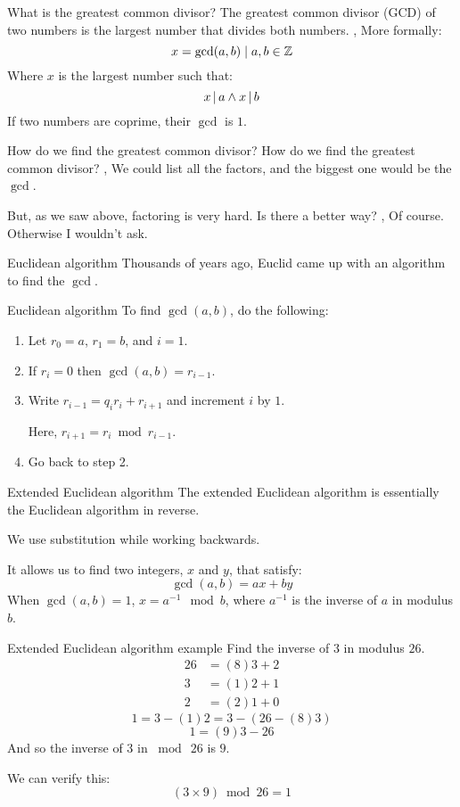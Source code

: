 \begin{namedframe}{What is the greatest common divisor?}
	The greatest common divisor (GCD) of two numbers is the largest number that divides both numbers.
	\sep
	More formally:
	\[x = \gcd(a, b) \mid a, b \in \mathbb{Z}\]
	Where $x$ is the largest number such that:
	\[x \operatorname{|} a \wedge x \operatorname{|} b\]
	\pause
	If two numbers are coprime, their $\gcd$ is $1$.
\end{namedframe}
\begin{namedframe}{How do we find the greatest common divisor?}
	How do we find the greatest common divisor?
	\sep
	We could list all the factors, and the biggest one would be the $\gcd$.

	But, as we saw above, factoring is very hard.
	Is there a better way?
	\sep
	Of course. Otherwise I wouldn't ask.
\end{namedframe}
\begin{namedframe}{Euclidean algorithm}
	Thousands of years ago, Euclid came up with an algorithm to find the $\gcd$.
	\begin{block}{Euclidean algorithm}
		To find $\gcd(a, b)$, do the following:
		\begin{enumerate}
			\item Let $r_0 = a$, $r_1 = b$, and $i = 1$.
			\item If $r_i = 0$ then $\gcd(a, b) = r_{i-1}$.
			\item Write $r_{i-1} = q_ir_i + r_{i+1}$ and increment $i$ by $1$.
			
			      Here, $r_{i+1} = r_i \bmod r_{i-1}$.
			\item Go back to step 2.
		\end{enumerate}
	\end{block}
\end{namedframe}
\begin{namedframe}{Extended Euclidean algorithm}
	The extended Euclidean algorithm is essentially the Euclidean algorithm in reverse.

	We use substitution while working backwards.

	It allows us to find two integers, $x$ and $y$, that satisfy:
	\[\gcd(a, b) = ax + by\]
	\pause
	When $\gcd(a, b) = 1$, $x = a^{-1} \mod b$, where $a^{-1}$ is the inverse of $a$ in modulus $b$.
\end{namedframe}
\begin{namedframe}{Extended Euclidean algorithm example}
	Find the inverse of $3$ in modulus $26$.
	\begin{align*}
		26 &= (8)3 + 2\\
		3  &= (1)2 + 1\\
		2  &= (2)1 + 0
	\end{align*}
	\pause
	\[1 = 3 - (1)2 = 3 - (26 - (8)3)\]
	\[1 = (9)3 - 26\]
	\pause
	And so the inverse of $3$ in $\bmod\ 26$ is $9$.
	
	We can verify this:
	\[(3 \times 9) \bmod 26 = 1\]
\end{namedframe}
